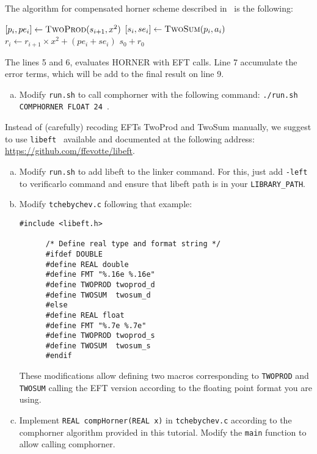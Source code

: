 The algorithm for compensated horner scheme described in~\cite{graillat2005compensated} is the following:

\begin{algorithmic}[1]
       \State $[p_i, pe_i] \gets \text{\sc TwoProd}(s_{i+1}, x^2)$
       \State $[s_i, se_i] \gets \text{\sc TwoSum}(p_i, a_i)$
       \State $r_i \gets r_{i+1}\times x^2+(pe_i+se_i)$
    \EndFor
    \State \Return $s_0 + r_0$
  \EndProcedure
\end{algorithmic}

The lines 5 and 6, evaluates HORNER with EFT calls. Line 7 accumulate the error terms, which will be add to the final result on line 9.

\begin{question}
  \begin{enumerate}[(a)]
    \item Modify {\tt run.sh} to call comphorner with the following command: {\tt ./run.sh COMPHORNER FLOAT 24 }.
  \end{enumerate}
\end{question}

Instead of (carefully) recoding EFTs {\sc TwoProd} and {\sc TwoSum} manually, we suggest to use {\tt libeft}~\cite{libeft} available and documented at the following address: \url{https://github.com/ffevotte/libeft}.

\begin{question}
  \begin{enumerate}[(a)]
    \item Modify {\tt run.sh} to add libeft to the linker command. For this, just add {\tt -left} to verificarlo command and ensure that libeft path is in your  {\tt LIBRARY\_PATH}.
    \item Modify {\tt tchebychev.c} following that example:

      {
      \begin{lstlisting}[style=customC, basicstyle=\normalsize]
      #include <libeft.h>

      /* Define real type and format string */
      #ifdef DOUBLE
      #define REAL double
      #define FMT "%.16e %.16e"
      #define TWOPROD twoprod_d
      #define TWOSUM  twosum_d
      #else
      #define REAL float
      #define FMT "%.7e %.7e"
      #define TWOPROD twoprod_s
      #define TWOSUM  twosum_s
      #endif
      \end{lstlisting}
      }

     These modifications allow defining two macros corresponding to  {\tt TWOPROD} and {\tt TWOSUM} calling the EFT version according to the floating point format you are using.


    \item Implement {\tt REAL compHorner(REAL x)} in {\tt tchebychev.c} according to the comphorner algorithm provided in this tutorial. Modify the {\tt main} function to allow calling comphorner.
    \end{enumerate}
\end{question}


